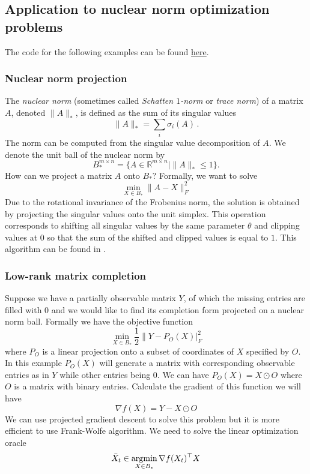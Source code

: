 \subsection{Application to nuclear norm optimization problems}

The code for the following examples can be found \href{https://ee227c.github.io/code/lecture5.html}{here}.

\subsubsection{Nuclear norm projection}
The \textit{nuclear norm} (sometimes called \textit{Schatten $1$-norm} or \textit{trace norm}) of a matrix $A$, denoted $\|A\|_*$, is defined as the sum of its singular values
\[
\|A\|_* = \sum_i \sigma_i(A)\,.
\]
The norm can be computed from the singular value decomposition of $A$.
We denote the unit ball of the nuclear norm by 
\[
B_*^{m\times n}=\{A\in\mathbb{R}^{m\times n} \mid \|A\|_*\le 1\}.
\]
How can we project a matrix $A$ onto $B_*$? Formally, we want to solve
\[
\min_{X\in B_*}\|A-X\|_F^2
\]
Due to the rotational invariance of the Frobenius norm, the solution is obtained by projecting the singular values onto the unit simplex. This operation corresponds to shifting all singular values by the same parameter $\theta$ and clipping values at $0$ so that the sum of the shifted and clipped values is equal to $1$. This algorithm can be found in \cite{Duchi2008}.

\subsubsection{Low-rank matrix completion}

Suppose we have a partially observable matrix $Y$, of which the missing entries are filled with 0 and we would like to find its completion form projected on a nuclear norm ball. Formally we have the objective function
\[
\min_{X\in B_*}\frac{1}{2}\|Y-P_O(X)|_F^2
\]
where $P_O$ is a linear projection onto a subset of coordinates of $X$ specified by $O$. In this example $P_O(X)$ will generate a matrix with corresponding observable entries as in $Y$ while other entries being 0. We can have $P_O(X) = X \odot O$ where $O$ is a matrix with binary entries.
Calculate the gradient of this function we will have
\[
\nabla f(X) = Y-X \odot O
\]
We can use projected gradient descent to solve this problem but it is more efficient to use Frank-Wolfe algorithm. We need to solve the linear optimization oracle
\[
\bar{X}_t\in \operatorname*{\arg\!\min}_{X\in{B_*}}\nabla f(X_t)^\top X
\]

